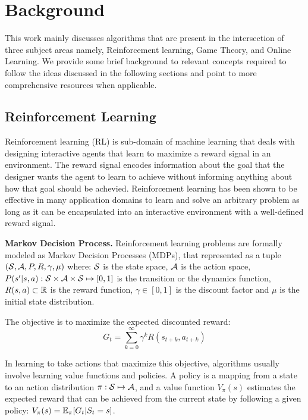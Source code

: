 \chapter{Background}
This work mainly discusses algorithms that are present in the intersection of three subject areas
namely, Reinforcement learning, Game Theory, and Online Learning.
We provide some brief background to relevant concepts required to follow the ideas discussed in the following sections 
and point to more comprehensive resources when applicable.

\section{Reinforcement
  Learning}

Reinforcement learning (RL) is sub-domain of machine learning that deals with designing interactive
agents that learn to maximize a reward signal in an environment.
The reward signal encodes information about the goal that the designer wants the agent to learn to
achieve without informing anything about how that goal should be achevied.
Reinforcement learning has been shown to be
effective in many application domains to learn and solve an arbitrary problem as long as it can be
encapsulated into an interactive environment with a well-defined reward signal.

\textbf{Markov Decision Process.} Reinforcement learning problems are formally modeled as Markov Decision Processes (MDPs), that represented 
as a 
tuple $(\mathcal{S}, \mathcal{A}, P, R, \gamma, \mu)$ where: $\mathcal{S}$ is the state space, $\mathcal{A}$ is the action space, 
$P(s'|s,a): \mathcal{S} \times \mathcal{A} \times \mathcal{S} \mapsto [0, 1]$ is the transition or the dynamics function, 
$R(s,a) \subset \mathbb{R}$ is the reward function,  
$\gamma \in [0,1]$ is the discount factor and $\mu$ is the initial state distribution.

The objective is to maximize the expected discounted reward:
$$G_t = \sum_{k=0}^{\infty} \gamma^k R(s_{t+k}, a_{t+k})$$

In learning to take actions that maximize this objective, algorithms usually involve learning value functions 
and policies. A policy is a mapping from a state to an action distribution $\pi: \mathcal{S} \mapsto \mathcal{A}$, and a value 
function $V_{\pi}(s)$ estimates the expected reward that can be achieved from the current state by following a 
given policy: $V_{\pi}(s) = \mathbb{E}_{\pi}[G_t | S_t = s]$.

